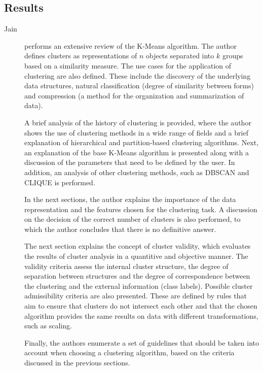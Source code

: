 \subsection{Results}\label{sec:clustering_sota_results}
\begin{description}
    \item[Jain]\cite{Jain_Dataclustering50_2010} performs an extensive review of the K-Means algorithm. The author defines clusters as representations of $n$ objects separated into $k$ groups based on a similarity measure. The use cases for the application of clustering are also defined. These include the discovery of the underlying data structures, natural classification (degree of similarity between forms) and compression (a method for the organization and summarization of data).
    
    A brief analysis of the history of clustering is provided, where the author shows the use of clustering methods in a wide range of fields and a brief explanation of hierarchical and partition-based clustering algorithms. Next, an explanation of the base K-Means algorithm is presented along with a discussion of the parameters that need to be defined by the user. In addition, an analysis of other clustering methods, such as DBSCAN and CLIQUE is performed. 

    In the next sections, the author explains the importance of the data representation and the features chosen for the clustering task. A discussion on the decision of the correct number of clusters is also performed, to which the author concludes that there is no definitive answer.

    The next section explains the concept of cluster validity, which evaluates the results of cluster analysis in a quantitive and objective manner. The validity criteria assess the internal cluster structure, the degree of separation between structures and the degree of correspondence between the clustering and the external information (class labels). Possible cluster admissibility criteria are also presented. These are defined by rules that aim to ensure that clusters do not intersect each other and that the chosen algorithm provides the same results on data with different transformations, such as scaling.
    
    Finally, the authors enumerate a set of guidelines that should be taken into account when choosing a clustering algorithm, based on the criteria discussed in the previous sections.
\end{description}

